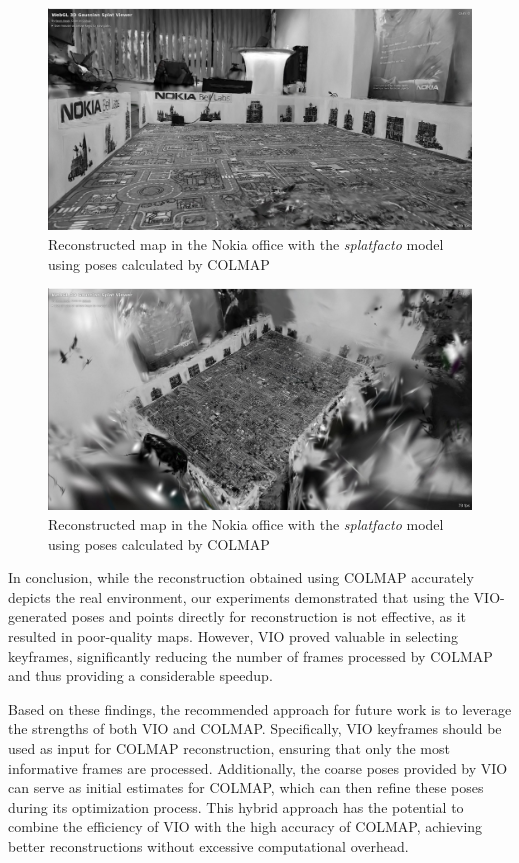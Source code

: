 \begin{figure}[htbp]
	\centering
	\includegraphics[width=150mm, keepaspectratio]{figures_jpg/nokia_splatfacto_1.jpg}
	\caption{Reconstructed map in the Nokia office with the \textit{splatfacto} model using poses calculated by COLMAP}
	\label{fig:nokia_splatfacto_colmap_1}
\end{figure}

\begin{figure}[htbp]
	\centering
	\includegraphics[width=150mm, keepaspectratio]{figures_jpg/nokia_splatfacto_2.jpg}
	\caption{Reconstructed map in the Nokia office with the \textit{splatfacto} model using poses calculated by COLMAP}
	\label{fig:nokia_splatfacto_colmap_2}
\end{figure}

In conclusion, while the reconstruction obtained using COLMAP accurately depicts the real environment, our experiments demonstrated that using the VIO-generated poses and points directly for reconstruction is not effective, as it resulted in poor-quality maps. However, VIO proved valuable in selecting keyframes, significantly reducing the number of frames processed by COLMAP and thus providing a considerable speedup.

Based on these findings, the recommended approach for future work is to leverage the strengths of both VIO and COLMAP. Specifically, VIO keyframes should be used as input for COLMAP reconstruction, ensuring that only the most informative frames are processed. Additionally, the coarse poses provided by VIO can serve as initial estimates for COLMAP, which can then refine these poses during its optimization process. This hybrid approach has the potential to combine the efficiency of VIO with the high accuracy of COLMAP, achieving better reconstructions without excessive computational overhead.
